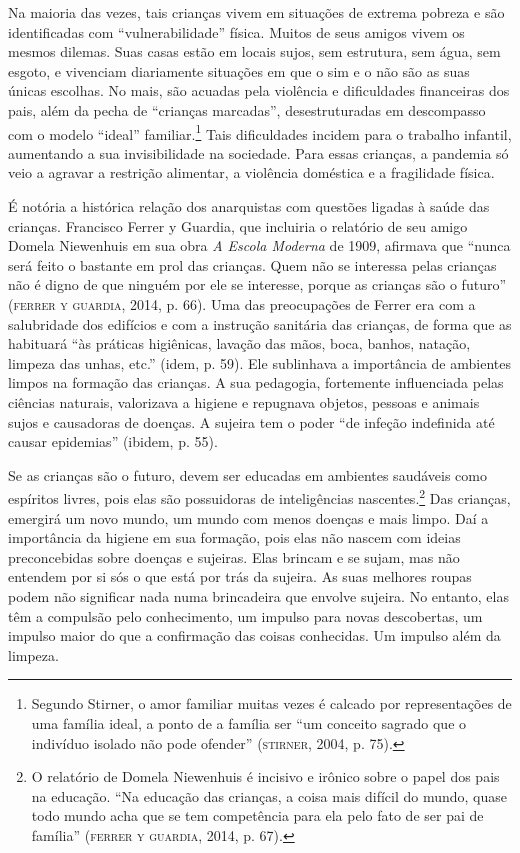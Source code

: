Na maioria das vezes, tais crianças vivem em situações de extrema
pobreza e são identificadas com ``vulnerabilidade'' física. Muitos de
seus amigos vivem os mesmos dilemas. Suas casas estão em locais sujos,
sem estrutura, sem água, sem esgoto, e vivenciam diariamente situações
em que o sim e o não são as suas únicas escolhas. No mais, são acuadas
pela violência e dificuldades financeiras dos pais, além da pecha de
``crianças marcadas'', desestruturadas em descompasso com o modelo
``ideal'' familiar.\footnote{Segundo Stirner, o amor familiar muitas
  vezes é calcado por representações de uma família ideal, a ponto de a
  família ser ``um conceito sagrado que o indivíduo isolado não pode
  ofender'' (\textsc{stirner}, 2004, p. 75).} Tais dificuldades incidem para o
trabalho infantil, aumentando a sua invisibilidade na sociedade. Para
essas crianças, a pandemia só veio a agravar a restrição alimentar, a
violência doméstica e a fragilidade física.

É notória a histórica relação dos anarquistas com questões ligadas à
saúde das crianças. Francisco Ferrer y Guardia, que incluiria o
relatório de seu amigo Domela Niewenhuis em sua obra \emph{A Escola
Moderna} de 1909, afirmava que ``nunca será feito o bastante em prol das
crianças. Quem não se interessa pelas crianças não é digno de que
ninguém por ele se interesse, porque as crianças são o futuro'' (\textsc{ferrer
y guardia}, 2014, p. 66). Uma das preocupações de Ferrer era com a
salubridade dos edifícios e com a instrução sanitária das crianças, de
forma que as habituará ``às práticas higiênicas, lavação das mãos, boca,
banhos, natação, limpeza das unhas, etc.'' (idem, p. 59). Ele sublinhava
a importância de ambientes limpos na formação das crianças. A sua
pedagogia, fortemente influenciada pelas ciências naturais, valorizava a
higiene e repugnava objetos, pessoas e animais sujos e causadoras de
doenças. A sujeira tem o poder ``de infeção indefinida até causar
epidemias'' (ibidem, p. 55).

Se as crianças são o futuro, devem ser educadas em ambientes saudáveis
como espíritos livres, pois elas são possuidoras de inteligências
nascentes.\footnote{O relatório de Domela Niewenhuis é incisivo e
  irônico sobre o papel dos pais na educação. ``Na educação das
  crianças, a coisa mais difícil do mundo, quase todo mundo acha que se
  tem competência para ela pelo fato de ser pai de família'' (\textsc{ferrer y
    guardia}, 2014, p. 67).} Das crianças, emergirá um novo mundo, um mundo
com menos doenças e mais limpo. Daí a importância da higiene em sua
formação, pois elas não nascem com ideias preconcebidas sobre doenças e
sujeiras. Elas brincam e se sujam, mas não entendem por si sós o que
está por trás da sujeira. As suas melhores roupas podem não significar
nada numa brincadeira que envolve sujeira. No entanto, elas têm a
compulsão pelo conhecimento, um impulso para novas descobertas, um
impulso maior do que a confirmação das coisas conhecidas. Um impulso
além da limpeza.

